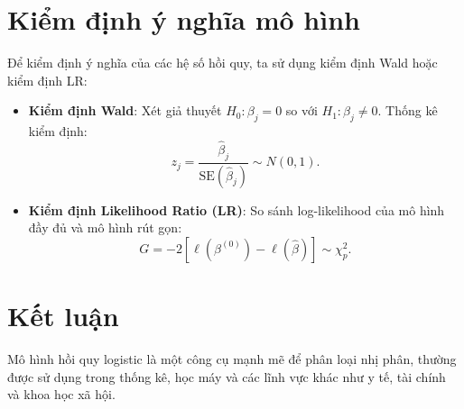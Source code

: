 \section{Kiểm định ý nghĩa mô hình}
Để kiểm định ý nghĩa của các hệ số hồi quy, ta sử dụng kiểm định Wald hoặc kiểm định LR:
\begin{itemize}
    \item \textbf{Kiểm định Wald}: Xét giả thuyết $H_0: \beta_j = 0$ so với $H_1: \beta_j \neq 0$. Thống kê kiểm định:
    \begin{equation}
    z_j = \frac{\hat{\beta}_j}{\text{SE}(\hat{\beta}_j)} \sim N(0,1).
    \end{equation}
    \item \textbf{Kiểm định Likelihood Ratio (LR)}: So sánh log-likelihood của mô hình đầy đủ và mô hình rút gọn:
    \begin{equation}
    G = -2 \left[ \ell(\beta^{(0)}) - \ell(\hat{\beta}) \right] \sim \chi^2_p.
    \end{equation}
\end{itemize}

\section{Kết luận}
Mô hình hồi quy logistic là một công cụ mạnh mẽ để phân loại nhị phân, thường được sử dụng trong thống kê, học máy và các lĩnh vực khác như y tế, tài chính và khoa học xã hội.
